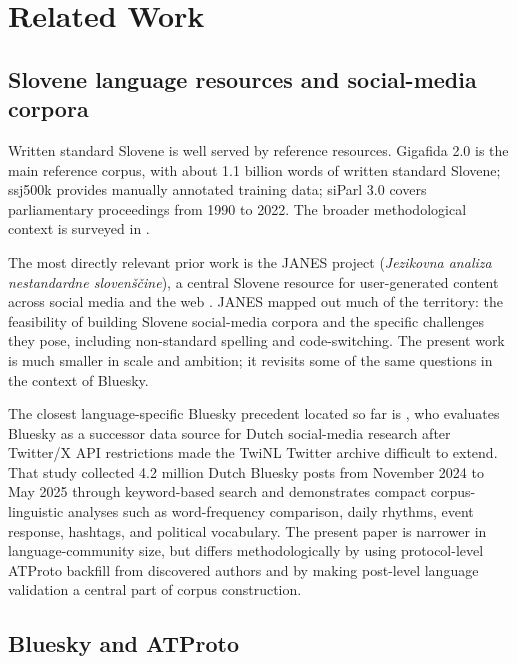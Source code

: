 \section{Related Work}

\subsection{Slovene language resources and social-media corpora}

Written standard Slovene is well served by reference resources. Gigafida 2.0 \parencite{krek2020b-gf,gigafida-clarin} is the main reference corpus, with about 1.1 billion words of written standard Slovene; ssj500k \parencite{krek2020a-ssj500k} provides manually annotated training data; siParl 3.0 \parencite{parliamentaryCorpus} covers parliamentary proceedings from 1990 to 2022. The broader methodological context is surveyed in \textcite{studije2005korpusnem}.

The most directly relevant prior work is the JANES project (\textit{Jezikovna analiza nestandardne slovenščine}), a central Slovene resource for user-generated content across social media and the web \parencite{erjavec2019janes}. JANES mapped out much of the territory: the feasibility of building Slovene social-media corpora and the specific challenges they pose, including non-standard spelling and code-switching. The present work is much smaller in scale and ambition; it revisits some of the same questions in the context of Bluesky.

The closest language-specific Bluesky precedent located so far is \textcite{tjongKimSang2025bluesky}, who evaluates Bluesky as a successor data source for Dutch social-media research after Twitter/X API restrictions made the TwiNL Twitter archive difficult to extend. That study collected 4.2 million Dutch Bluesky posts from November 2024 to May 2025 through keyword-based search and demonstrates compact corpus-linguistic analyses such as word-frequency comparison, daily rhythms, event response, hashtags, and political vocabulary. The present paper is narrower in language-community size, but differs methodologically by using protocol-level ATProto backfill from discovered authors and by making post-level language validation a central part of corpus construction.

\subsection{Bluesky and ATProto}

